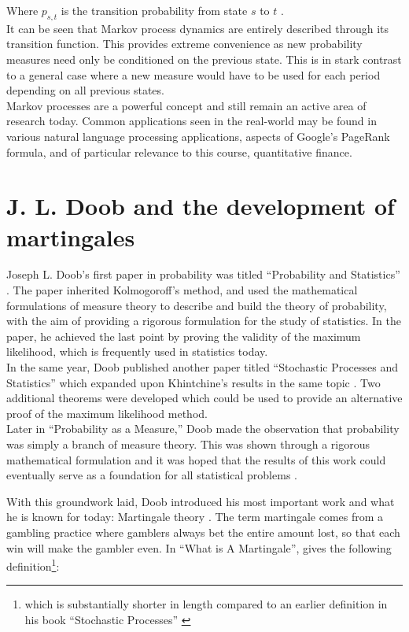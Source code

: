 \documentclass{article}
\begin{document}
Where $p_{s,t}$ is the transition probability from state $s$ to $t$ \parencite{Daruich2014}. \\

It can be seen that Markov process dynamics are entirely described through its transition function. This provides extreme convenience as new probability measures need only be conditioned on the previous state. This is in stark contrast to a general case where a new measure would have to be used for each period depending on all previous states. \\

Markov processes are a powerful concept and still remain an active area of research today. Common applications seen in the real-world may be found in various natural language processing applications, aspects of Google’s PageRank formula, and of particular relevance to this course, quantitative finance. 

\section{J. L. Doob and the development of martingales}
Joseph L. Doob's first paper in probability was titled ``Probability and Statistics'' \parencite{Athreya2015, Doob1934}. The paper inherited Kolmogoroff's method, and used the mathematical formulations of measure theory to describe and build the theory of probability, with the aim of providing a rigorous formulation for the study of statistics. In the paper, he achieved the last point by proving the validity of the maximum likelihood, which is frequently used in statistics today.  \\

In the same year, Doob published another paper titled ``Stochastic Processes and Statistics'' which expanded upon Khintchine's results in the same topic \parencite{Doob1934a}. Two additional theorems were developed which could be used to provide an alternative proof of the maximum likelihood method. \\

Later in ``Probability as a Measure,'' Doob made the observation that probability was simply a branch of measure theory. This was shown through a rigorous mathematical formulation and it was hoped that the results of this work could eventually serve as a foundation for all statistical problems \parencite{Doob1941}. 

With this groundwork laid, Doob introduced his most important work and what he is known for today: Martingale theory \parencite{Doob1941}. The term martingale comes from a gambling practice where gamblers always bet the entire amount lost, so that each win will make the gambler even. In ``What is A Martingale'', \textcite{Doob1971} gives the following definition\footnote{which is substantially shorter in length compared to an earlier definition in his book ``Stochastic Processes'' \parencite{Doob1953}}: \\
\end{document}
